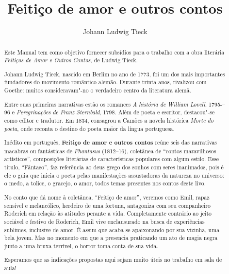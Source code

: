 \documentclass[12pt]{extarticle}
\begin{document}
\newcommand{\AutorLivro}{Johann Ludwig Tieck}
\newcommand{\TituloLivro}{Feitiço de amor e outros contos}
\newcommand{\Tema}{Ficção, mistério e fantasia}
\newcommand{\Genero}{Conto, crônica e novela}
\newcommand{\imagemCapa}{./images/PNLD0041-01.png}
\newcommand{\issnppub}{978-65-994422-3-0}
\newcommand{\issnepub}{978-65-994422-0-9}
\newcommand{\colaborador}{{Michelle Etienne Florence, Bruno Gradella e Vicente Castro}}


\title{\TituloLivro}
\author{\AutorLivro}
\def\authornotes{\colaborador}

\date{}
\maketitle


\begin{abstract}
Este Manual tem como objetivo fornecer subsídios para o trabalho com a
obra literária \emph{Feitiços de Amor e Outros Contos}, de Ludwig Tieck.

Johann Ludwig Tieck, nascido em Berlim no ano de 1773, foi um dos mais 
importantes fundadores do movimento romântico alemão. Durante trinta anos, 
rivalizou com Goethe: muitos consideravam"-no o verdadeiro centro da
literatura alemã. 

Entre suas primeiras narrativas estão os romances \emph{A história de William 
Lovell}, 1795-–96 e \emph{Peregrinações de Franz Sternbald}, 1798. Além de poeta 
e escritor, destacou"-se como editor e tradutor. Em 1834, consagrou a Camões
a novela histórica \emph{Morte do poeta}, onde reconta o destino do poeta 
maior da língua portuguesa. 

Inédito em português, \textbf{Feitiço de amor e outros contos} reúne seis das 
narrativas macabras ou fantásticas de \textit{Phantasus} (1812--16), coletânea 
de ``contos maravilhosos artísticos'', composições literárias de características 
populares com algum estilo. Esse título, ``Fântaso'', faz referência ao deus grego 
dos sonhos com seres inanimados, pois é ele o guia que inicia o poeta pelas
manifestações assustadoras da natureza no universo: o medo, a tolice, o gracejo, 
o amor, todos temas presentes nos contos deste livo. 

No conto que dá nome à coletânea, ``Feitiço de amor'', veremos como Emil, rapaz
sensível e melancólico, herdeiro de uma fortuna, antagoniza com seu companheiro 
Roderich em relação às atitudes perante a vida. Completamente contrário ao jeito
sociável e festivo de Roderich, Emil vive enclausurado na busca de experiências 
sublimes, inclusive de amor. É assim que acaba se apaixonando por sua vizinha, 
uma bela jovem. Mas no momento em que a presencia praticando um ato de magia negra
junto a uma bruxa terrível, o horror toma conta de sua vida. 

Esperamos que as indicações propostas aqui sejam muito úteis no trabalho em
sala de aula! 





\end{abstract}
\end{document}
